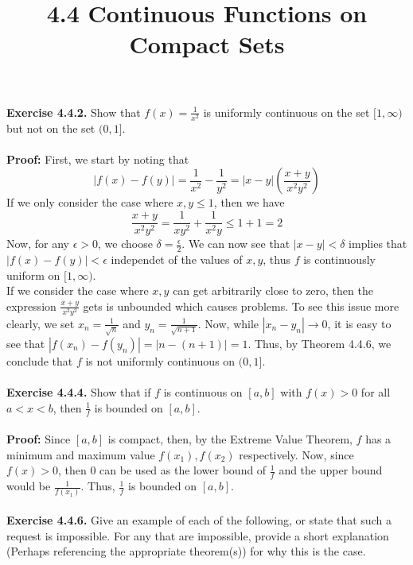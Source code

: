 \documentclass{article}
\title{\textbf{4.4 Continuous Functions on Compact Sets}}
\begin{document}
	\maketitle
	\textbf{Exercise 4.4.2.} Show that $f(x) = \frac{1}{x^2}$ is uniformly continuous on the set $[1, \infty)$ but not on the set $(0, 1]$. \\ \\
	\textbf{Proof:} First, we start by noting that 
	$$|f(x) - f(y)| = \frac{1}{x^2} - \frac{1}{y^2} = |x - y|\left(\frac{x + y}{x^2y^2}\right)$$
	If we only consider the case where $x, y \leq 1$, then we have 
	$$\frac{x + y}{x^2y^2} = \frac{1}{xy^2} + \frac{1}{x^2y} \leq 1 + 1 = 2$$
	Now, for any $\epsilon > 0$, we choose $\delta = \frac{\epsilon}{2}$. We can now see that $|x - y| < \delta$ implies that $|f(x) - f(y)| < \epsilon$ independet of the values of $x, y$, thus $f$ is continuously uniform on $[1, \infty)$. \\
	If we consider the case where $x, y$ can get arbitrarily close to zero, then the expression $\frac{x + y}{x^2y^2}$ gets is unbounded which causes problems. To see this issue more clearly, we set $x_n = \frac{1}{\sqrt{n}}$ and $y_n = \frac{1}{\sqrt{n + 1}}$. Now, while $|x_n - y_n| \to 0$, it is easy to see that $|f(x_n) - f(y_n)| = |n - (n + 1)| = 1$. Thus, by Theorem 4.4.6, we conclude that $f$ is not uniformly continuous on $(0, 1]$. \\ \\
	\textbf{Exercise 4.4.4.} Show that if $f$ is continuous on $[a, b]$ with $f(x) > 0$ for all $a < x < b$, then $\frac{1}{f}$ is bounded on $[a, b]$. \\ \\
	\textbf{Proof:} Since $[a, b]$ is compact, then, by the Extreme Value Theorem, $f$ has a minimum and maximum value $f(x_1), f(x_2)$ respectively. Now, since $f(x) > 0$, then 0 can be used as the lower bound of $\frac{1}{f}$ and the upper bound would be $\frac{1}{f(x_1)}$. Thus, $\frac{1}{f}$ is bounded on $[a, b]$. \\ \\
	\textbf{Exercise 4.4.6.} Give an example of each of the following, or state that such a request is impossible. For any that are impossible, provide a short explanation (Perhaps referencing the appropriate theorem(s)) for why this is the case.
\end{document}
